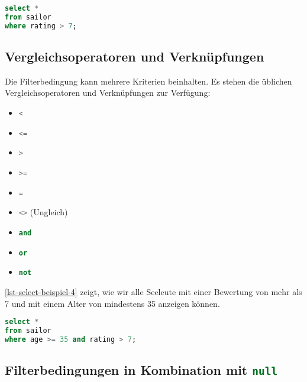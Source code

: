 \begin{lstlisting}[language=SQL, upquote=true, morekeywords={real, text}, caption={Es werden nur diejenigen Zeilen angezeigt, welche ein \lstinline{rating} von mehr als \num{7} besitzen.}, label={lst-select-beispiel-3}]
select *
from sailor
where rating > 7;
\end{lstlisting}

\subsection{Vergleichsoperatoren und Verknüpfungen}

Die Filterbedingung kann mehrere Kriterien beinhalten. Es stehen die üblichen Vergleichsoperatoren und Verknüpfungen zur Verfügung:

\begin{multicols}{3}
\begin{itemize}
\item \lstinline[language=SQL]{<}
\item \lstinline[language=SQL]{<=}
\item \lstinline[language=SQL]{>}
\item \lstinline[language=SQL]{>=}
\item \lstinline[language=SQL]{=}
\item \lstinline[language=SQL]{<>} (Ungleich)
\item \lstinline[language=SQL]{and}
\item \lstinline[language=SQL]{or}
\item \lstinline[language=SQL]{not}
\end{itemize}
\end{multicols}

\autoref{lst-select-beispiel-4} zeigt, wie wir alle Seeleute mit einer Bewertung von mehr als \num{7} und mit einem Alter von mindestens \num{35} anzeigen können.

\begin{lstlisting}[language=SQL, upquote=true, morekeywords={real, text}, caption={Bedingung mit \num{2} Kriterien. Beide müssen erfüllt sein, damit die Zeile angezeigt wird.}, label={lst-select-beispiel-4}]
select *
from sailor
where age >= 35 and rating > 7;
\end{lstlisting}

\subsection{Filterbedingungen in Kombination mit \lstinline[language=SQL]{null}}

